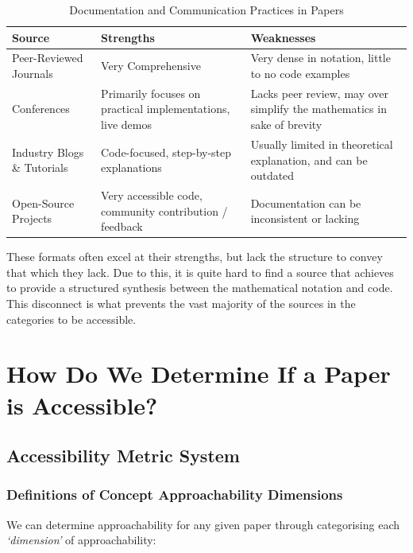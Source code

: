 \begin{table}[h]
    \centering
    \small
    \renewcommand{\arraystretch}{1.75}
    \caption{Documentation and Communication Practices in Papers}
    \label{tab:paper-documentation-communication}
    \begin{tabularx}{\textwidth}{@{} l X X @{}}
        \toprule
        \textbf{Source} & \textbf{Strengths} & \textbf{Weaknesses} \\ \midrule
        Peer-Reviewed Journals & Very Comprehensive & Very dense in notation, little to no code examples \\
        Conferences & Primarily focuses on practical implementations, live demos & Lacks peer review, may over simplify the mathematics in sake of brevity \\
        Industry Blogs \& Tutorials & Code-focused, step-by-step explanations & Usually limited in theoretical explanation, and can be outdated \\
        Open-Source Projects & Very accessible code, community contribution / feedback & Documentation can be inconsistent or lacking \\ \bottomrule
    \end{tabularx}
\end{table}

These formats often excel at their strengths, but lack the structure to convey that which they lack. Due to this, it is quite hard to find a source that achieves to provide a structured
synthesis between the mathematical notation and code. This disconnect is what prevents the vast majority of the sources in the categories to be accessible.

\section{How Do We Determine If a Paper is Accessible?}

\subsection{Accessibility Metric System}

\subsubsection*{Definitions of Concept Approachability Dimensions}

We can determine approachability for any given paper through categorising each \textit{`dimension'} of approachability:

